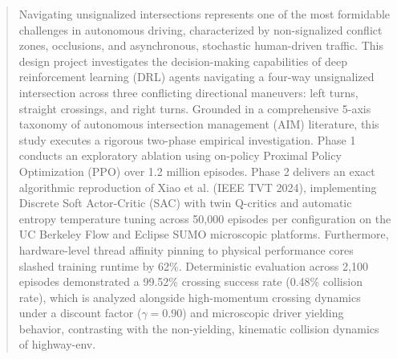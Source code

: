 \documentclass{iutbscthesis}
\begin{document}
\begin{abstract}
Navigating unsignalized intersections represents one of the most formidable challenges in autonomous driving, characterized by non-signalized conflict zones, occlusions, and asynchronous, stochastic human-driven traffic. This design project investigates the decision-making capabilities of deep reinforcement learning (DRL) agents navigating a four-way unsignalized intersection across three conflicting directional maneuvers: left turns, straight crossings, and right turns. Grounded in a comprehensive 5-axis taxonomy of autonomous intersection management (AIM) literature, this study executes a rigorous two-phase empirical investigation. Phase 1 conducts an exploratory ablation using on-policy Proximal Policy Optimization (PPO) over 1.2 million episodes. Phase 2 delivers an exact algorithmic reproduction of Xiao et al. (IEEE TVT 2024), implementing Discrete Soft Actor-Critic (SAC) with twin Q-critics and automatic entropy temperature tuning across 50,000 episodes per configuration on the UC Berkeley Flow and Eclipse SUMO microscopic platforms. Furthermore, hardware-level thread affinity pinning to physical performance cores slashed training runtime by 62\%. Deterministic evaluation across 2,100 episodes demonstrated a 99.52\% crossing success rate (0.48\% collision rate), which is analyzed alongside high-momentum crossing dynamics under a discount factor ($\gamma=0.90$) and microscopic driver yielding behavior, contrasting with the non-yielding, kinematic collision dynamics of highway-env.
\end{abstract}












\printbib
\end{document}

